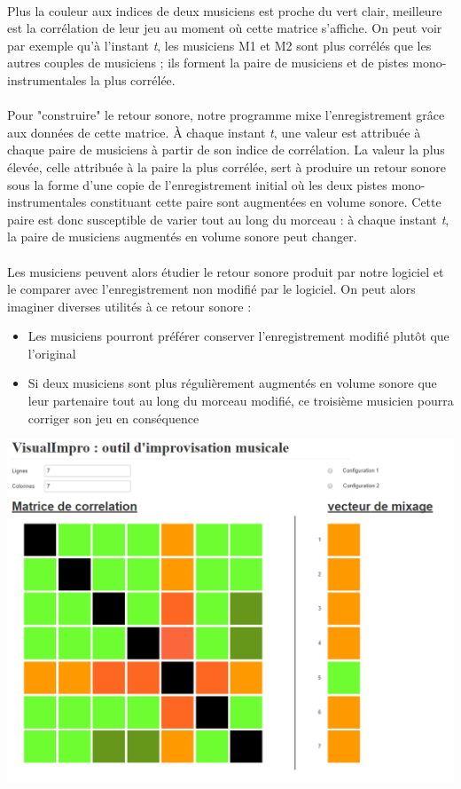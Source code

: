 \documentclass{article}
\begin{document}
\paragraph{}
Plus la couleur aux indices de deux musiciens est proche du vert clair,
meilleure est la corrélation de leur jeu au moment où cette matrice s'affiche.
On peut voir par exemple qu'à l'instant \textit{t}, les musiciens M1 et M2
sont plus corrélés que les autres couples de musiciens ; ils forment la paire
de musiciens et de pistes mono-instrumentales la plus corrélée.
\paragraph{}
Pour "construire" le retour sonore, notre programme mixe l'enregistrement
grâce aux données de cette matrice. À chaque instant \textit{t}, une valeur
est attribuée à chaque paire de musiciens à partir de son indice de
corrélation. La valeur la plus élevée, celle attribuée à la paire la plus
corrélée, sert à produire un retour sonore sous la forme d'une copie de
l'enregistrement initial où les deux pistes mono-instrumentales constituant
cette paire sont augmentées en volume sonore. Cette paire est donc susceptible
de varier tout au long du morceau : à chaque instant \textit{t}, la paire de
musiciens augmentés en volume sonore peut changer.
\paragraph{}
Les musiciens peuvent alors étudier le retour sonore produit par notre logiciel
et le comparer avec l'enregistrement non modifié par le logiciel. On peut
alors imaginer diverses utilités à ce retour sonore :
\begin{itemize}
 \item Les musiciens pourront préférer conserver l'enregistrement modifié plutôt
       que l'original
 \item Si deux musiciens sont plus régulièrement augmentés en volume sonore que
       leur partenaire tout au long du morceau modifié, ce troisième musicien pourra
       corriger son jeu en conséquence
\end{itemize}


\centering
\includegraphics[scale=0.30]{proto_2.png}
\end{document}
